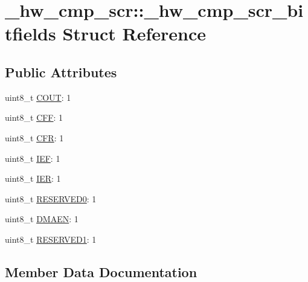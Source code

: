\hypertarget{struct__hw__cmp__scr_1_1__hw__cmp__scr__bitfields}{}\section{\+\_\+hw\+\_\+cmp\+\_\+scr\+:\+:\+\_\+hw\+\_\+cmp\+\_\+scr\+\_\+bitfields Struct Reference}
\label{struct__hw__cmp__scr_1_1__hw__cmp__scr__bitfields}
\subsection*{Public Attributes}
\begin{DoxyCompactItemize}
\item 
uint8\+\_\+t \hyperlink{struct__hw__cmp__scr_1_1__hw__cmp__scr__bitfields_af7391373e83dfcfa10e36692bbf8a089}{C\+O\+UT}\+: 1
\item 
uint8\+\_\+t \hyperlink{struct__hw__cmp__scr_1_1__hw__cmp__scr__bitfields_ac38938d99a171fe3d8e4a7a14759c42f}{C\+FF}\+: 1
\item 
uint8\+\_\+t \hyperlink{struct__hw__cmp__scr_1_1__hw__cmp__scr__bitfields_a597aba25942a06fb39fc079063b59aa4}{C\+FR}\+: 1
\item 
uint8\+\_\+t \hyperlink{struct__hw__cmp__scr_1_1__hw__cmp__scr__bitfields_a85cd6d32067cf9afa40fa1646cbf5537}{I\+EF}\+: 1
\item 
uint8\+\_\+t \hyperlink{struct__hw__cmp__scr_1_1__hw__cmp__scr__bitfields_af5074a1e2f4640ce2277b63af888abb8}{I\+ER}\+: 1
\item 
uint8\+\_\+t \hyperlink{struct__hw__cmp__scr_1_1__hw__cmp__scr__bitfields_a4fa01d9d670306c6ac2350ba144ce83c}{R\+E\+S\+E\+R\+V\+E\+D0}\+: 1
\item 
uint8\+\_\+t \hyperlink{struct__hw__cmp__scr_1_1__hw__cmp__scr__bitfields_a3a55f3bcecb9f0375a65b4fa9810718e}{D\+M\+A\+EN}\+: 1
\item 
uint8\+\_\+t \hyperlink{struct__hw__cmp__scr_1_1__hw__cmp__scr__bitfields_ae0fbf19003d65772028f3a9f6ed96a95}{R\+E\+S\+E\+R\+V\+E\+D1}\+: 1
\end{DoxyCompactItemize}


\subsection{Member Data Documentation}
